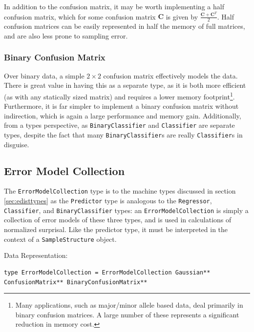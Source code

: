 \documentclass{article}
\newcommand{\mat}[1]{\mathbf{#1}}
\begin{document}
\begin{multicols}{2}
\color{cont}

In addition to the confusion matrix, it may be worth implementing a half confusion matrix, which for some confusion matrix $\mat{C}$ is given by $\frac{\mat{C} + \mat{C}^T}{2}$.  Half confusion matrices can be easily represented in half the memory of full matrices, and are also less prone to sampling error.

\color{textcol}

\subsubsection{Binary Confusion Matrix}

Over binary data, a simple $2 \times 2$ confusion matrix effectively models the data.  There is great value in having this as a separate type, as it is both more efficient (as with any statically sized matrix) and requires a lower memory footprint\footnote{Many applications, such as major/minor allele based data, deal primarily in binary confusion matrices.  A large number of these represents a significant reduction in memory cost.}.  Furthermore, it is far simpler to implement a binary confusion matrix without indirection, which is again a large performance and memory gain.  Additionally, from a types perspective, as \texttt{BinaryClassifier} and \texttt{Classifier} are separate types, despite the fact that many \texttt{BinaryClassifier}s are really \texttt{Classifier}s in disguise.

\subsection{Error Model Collection}

The \texttt{ErrorModelCollection} type is to the machine types discussed in section \ref{sec:edisttypes} as the \texttt{Predictor} type is analogous to the \texttt{Regressor}, \texttt{Classifier}, and \texttt{BinaryClassifier} types: an \texttt{ErrorModelCollection} is simply a collection of error models of these three types, and is used in calculations of normalized surprisal.  Like the predictor type, it must be interpreted in the context of a \texttt{SampleStructure} object.

\par\bigskip
Data Representation:

\texttt{type ErrorModelCollection = ErrorModelCollection Gaussian** ConfusionMatrix** BinaryConfusionMatrix**} %

\end{multicols}
\pagebreak[2]
\end{document}
